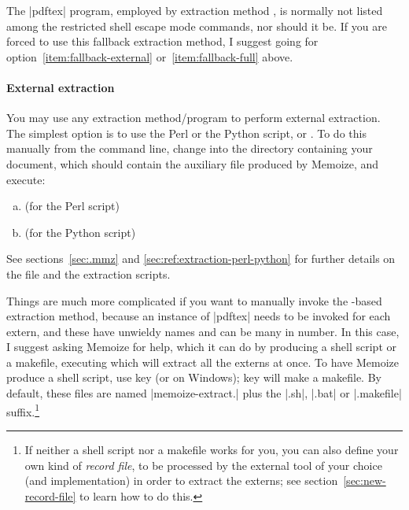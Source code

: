 \documentclass[a4paper,11pt]{article}
\begin{document}
The |pdftex| program, employed by extraction method , is
normally not listed among the restricted shell escape mode commands, nor should
it be.  If you are forced to use this fallback extraction method, I suggest
going for option~\ref{item:fallback-external} or~\ref{item:fallback-full}
above.

\paragraph{External extraction}
  
You may use any extraction method\slash program to perform external extraction.
The simplest option is to use the Perl or the Python script,
 or .  To do this
manually from the command line, change into the directory containing your
document, which should contain the auxiliary \dmmz file produced by Memoize,
and execute:
  
\begin{enumerate}[(a)]
\item {} \dmmz \hfill (for
  the Perl script)
\item {} \dmmz \hfill (for
  the Python script)
\end{enumerate}

See sections~\ref{sec:.mmz} and \ref{sec:ref:extraction-perl-python} for
further details on the \dmmz file and the extraction scripts.

Things are much more complicated if you want to manually invoke the
-based extraction method, because an instance of |pdftex| needs to
be invoked for each extern, and these have unwieldy names and can be many in
number.  In this case, I suggest asking Memoize for help, which it can do by
producing a shell script or a makefile, executing which will extract all the
externs at once. To have Memoize produce a shell script, use key
 (or
 on Windows); key
 will make a makefile.  By
default, these files are named |memoize-extract.| plus the
|.sh|, |.bat| or |.makefile| suffix.\footnote{If neither a shell script nor a
  makefile works for you, you can also define your own kind of \emph{record
    file}, to be processed by the external tool of your choice (and
  implementation) in order to extract the externs; see
  section~\ref{sec:new-record-file} to learn how to do this.}
\end{document}

